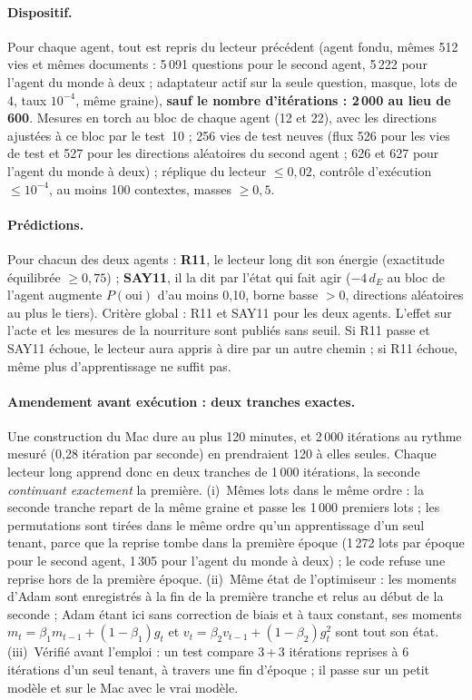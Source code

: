 \documentclass[11pt,a4paper]{article}
\newcommand{\dE}{d_{E}}
\begin{document}
\paragraph{Dispositif.} Pour chaque agent, tout est repris du lecteur précédent
(agent fondu, mêmes 512 vies et mêmes documents : 5\,091 questions pour le second
agent, 5\,222 pour l'agent du monde à deux ; adaptateur actif sur la seule question,
masque, lots de 4, taux $10^{-4}$, même graine), \textbf{sauf le nombre
d'itérations : 2\,000 au lieu de 600}. Mesures en torch au bloc de chaque agent
(12 et 22), avec les directions ajustées à ce bloc par le test~10 ; 256 vies de test
neuves (flux 526 pour les vies de test et 527 pour les directions aléatoires
du second agent ; 626 et 627 pour l'agent du monde à deux) ; réplique du lecteur $\le0,02$, contrôle
d'exécution $\le10^{-4}$, au moins 100 contextes, masses $\ge0,5$.

\paragraph{Prédictions.} Pour chacun des deux agents :
\textbf{R11}, le lecteur long dit son énergie (exactitude équilibrée $\ge0,75$) ;
\textbf{SAY11}, il la dit par l'état qui fait agir ($-4\,\dE$ au bloc de l'agent
augmente $P(\text{oui})$ d'au moins 0,10, borne basse $>0$, directions aléatoires au
plus le tiers). Critère global : R11 et SAY11 pour les deux agents. L'effet sur
l'acte et les mesures de la nourriture sont publiés sans seuil. Si R11 passe et SAY11 échoue, le
lecteur aura appris à dire par un autre chemin ; si R11 échoue, même plus
d'apprentissage ne suffit pas.

\paragraph{Amendement avant exécution : deux tranches exactes.} Une construction du
Mac dure au plus 120 minutes, et 2\,000 itérations au rythme mesuré (0,28 itération
par seconde) en prendraient 120 à elles seules. Chaque lecteur long apprend donc en
deux tranches de 1\,000 itérations, la seconde \emph{continuant exactement} la
première. (i)~Mêmes lots dans le même ordre : la seconde tranche repart de la même
graine et passe les 1\,000 premiers lots ; les permutations sont tirées dans le
même ordre qu'un apprentissage d'un seul tenant, parce que la reprise tombe dans la
première époque (1\,272 lots par époque pour le second agent, 1\,305 pour l'agent du
monde à deux) ; le code refuse une reprise hors de la première époque. (ii)~Même
état de l'optimiseur : les moments d'Adam sont enregistrés à la fin de la première
tranche et relus au début de la seconde ; Adam étant ici sans correction de biais et
à taux constant, ses moments
$m_t=\beta_1m_{t-1}+(1-\beta_1)g_t$ et $v_t=\beta_2v_{t-1}+(1-\beta_2)g_t^2$ sont tout
son état. (iii)~Vérifié avant l'emploi : un test compare 3\,+\,3 itérations reprises à
6 itérations d'un seul tenant, à travers une fin d'époque ; il passe sur un petit
modèle et sur le Mac avec le vrai modèle.
\end{document}

